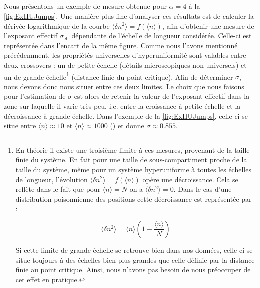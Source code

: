 \subparagraph{}Nous présentons un exemple de mesure obtenue pour $\alpha=4$ à la \autoref{fig:ExHUJumps}. Une manière plus fine d'analyser ces résultats est de calculer la dérivée logarithmique de la courbe $\langle \delta n^2 \rangle = f(\langle n \rangle)$, afin d'obtenir une mesure de l'exposant effectif $\sigma_\text{eff}$ dépendante de l'échelle de longueur considérée. Celle-ci est représentée dans l'encart de la même figure. Comme nous l'avons mentionné précédemment, les propriétés universelles d'hyperuniformité sont valables entre deux crossovers : un de petite échelle (détails microscopiques non-universels) et un de grande échelle\footnote{En théorie il existe une troisième limite à ces mesures, provenant de la taille finie du système. En fait pour une taille de sous-compartiment proche de la taille du système, même pour un système hyperuniforme à toutes les échelles de longueur, l'évolution  $\langle \delta n^2 \rangle = f(\langle n \rangle)$ opère une décroissance. Cela se reflète dans le fait que pour $\langle n \rangle = N$ on a $\langle \delta n^2 \rangle =0$. Dans le cas d'une distribution poisonnienne des positions cette décroissance est représentée par :

\begin{equation}
	 \langle \delta n^2 \rangle  = \langle n \rangle \left( 1-\frac{\langle n \rangle}{N} \right)
\end{equation}

\noindent Si cette limite de grande échelle se retrouve bien dans nos données, celle-ci se situe toujours à des échelles bien plus grandes que celle définie par la distance finie au point critique. Ainsi, nous n'avons pas besoin de nous préoccuper de cet effet en pratique.} (distance finie du point critique). Afin de déterminer $\sigma$, nous devons donc nous situer entre ces deux limites. Le choix que nous faisons pour l'estimation de $\sigma$ est alors de retenir la valeur de l'exposant effectif dans la zone sur laquelle il varie très peu, i.e. entre la croissance à petite échelle et la décroissance à grande échelle. Dans l'exemple de la \autoref{fig:ExHUJumps}, celle-ci se situe entre $\langle n \rangle \approx 10$ et $\langle n \rangle \approx 1000$ () et donne $\sigma\approx 0.855$.


